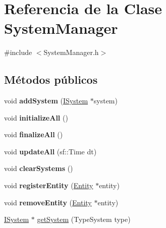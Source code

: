 \hypertarget{classSystemManager}{}\section{Referencia de la Clase System\+Manager}
\label{classSystemManager}


{\ttfamily \#include $<$System\+Manager.\+h$>$}

\subsection*{Métodos públicos}
\begin{DoxyCompactItemize}
\item 
\hypertarget{classSystemManager_a91036e83bab4d9eef28f8f125f7c13be}{}void {\bfseries add\+System} (\hyperlink{classISystem}{I\+System} $\ast$system)\label{classSystemManager_a91036e83bab4d9eef28f8f125f7c13be}

\item 
\hypertarget{classSystemManager_a17d7e8b3fe17a779b427c158d3d2acd9}{}void {\bfseries initialize\+All} ()\label{classSystemManager_a17d7e8b3fe17a779b427c158d3d2acd9}

\item 
\hypertarget{classSystemManager_a38e097df9643260dee3c06b38f183623}{}void {\bfseries finalize\+All} ()\label{classSystemManager_a38e097df9643260dee3c06b38f183623}

\item 
\hypertarget{classSystemManager_ae491338fb8d78a02d523e966a7bead76}{}void {\bfseries update\+All} (sf\+::\+Time dt)\label{classSystemManager_ae491338fb8d78a02d523e966a7bead76}

\item 
\hypertarget{classSystemManager_ad9dfb274070f5befa1980b34ca8dc9e0}{}void {\bfseries clear\+Systems} ()\label{classSystemManager_ad9dfb274070f5befa1980b34ca8dc9e0}

\item 
\hypertarget{classSystemManager_a88f8c568af7097ae892790f274bdd028}{}void {\bfseries register\+Entity} (\hyperlink{classEntity}{Entity} $\ast$entity)\label{classSystemManager_a88f8c568af7097ae892790f274bdd028}

\item 
\hypertarget{classSystemManager_aa771cc05088aaaa32dbf67863820a0c4}{}void {\bfseries remove\+Entity} (\hyperlink{classEntity}{Entity} $\ast$entity)\label{classSystemManager_aa771cc05088aaaa32dbf67863820a0c4}

\item 
\hyperlink{classISystem}{I\+System} $\ast$ \hyperlink{classSystemManager_a6c8d24328cfae009b400d32dae9d2dd7}{get\+System} (Type\+System type)
\end{DoxyCompactItemize}


